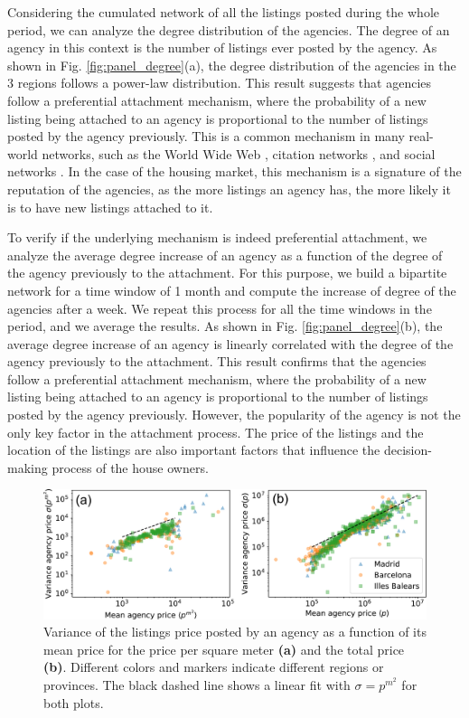 Considering the cumulated network of all the listings posted during the whole period, we can analyze the degree distribution of the agencies. The degree of an agency in this context is the number of listings ever posted by the agency. As shown in Fig. \ref{fig:panel_degree}(a), the degree distribution of the agencies in the 3 regions follows a power-law distribution. This result suggests that agencies follow a preferential attachment mechanism, where the probability of a new listing being attached to an agency is proportional to the number of listings posted by the agency previously. This is a common mechanism in many real-world networks, such as the World Wide Web \cite{barabasi1999emergence}, citation networks \cite{redner1998popular}, and social networks \cite{barabasi1999emergence}. In the case of the housing market, this mechanism is a signature of the reputation of the agencies, as the more listings an agency has, the more likely it is to have new listings attached to it.

To verify if the underlying mechanism is indeed preferential attachment, we analyze the average degree increase of an agency as a function of the degree of the agency previously to the attachment. For this purpose, we build a bipartite network for a time window of 1 month and compute the increase of degree of the agencies after a week. We repeat this process for all the time windows in the period, and we average the results. As shown in Fig. \ref{fig:panel_degree}(b), the average degree increase of an agency is linearly correlated with the degree of the agency previously to the attachment. This result confirms that the agencies follow a preferential attachment mechanism, where the probability of a new listing being attached to an agency is proportional to the number of listings posted by the agency previously. However, the popularity of the agency is not the only key factor in the attachment process. The price of the listings and the location of the listings are also important factors that influence the decision-making process of the house owners.

\begin{figure}
    \centering
    \includegraphics[width =\textwidth]{Figs/Idealista_dynamics/labeled_sigma_price.pdf}
	\caption[Variance of the agency price vs mean agency price.]{Variance of the listings price posted by an agency as a function of its mean price for the price per square meter \textbf{(a)} and the total price \textbf{(b)}. Different colors and markers indicate different regions or provinces. The black dashed line shows a linear fit with $\sigma = p^{{m}^2}$ for both plots. \label{fig:sigma_price}}
\end{figure}


